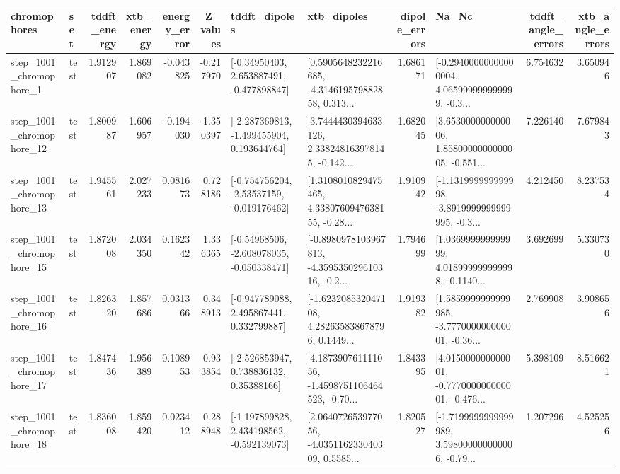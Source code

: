 \begin{tabular}{llrrrrllrlrr}
\toprule
             chromophores &       set &  tddft\_energy &  xtb\_energy &  energy\_error &  Z\_values &                               tddft\_dipoles &                                        xtb\_dipoles &  dipole\_errors &                                              Na\_Nc &  tddft\_angle\_errors &  xtb\_angle\_errors \\
\midrule
  step\_1001\_chromophore\_1 &      test &      1.912907 &    1.869082 &     -0.043825 & -0.217970 &    [-0.34950403, 2.653887491, -0.477898847] &  [0.5905648232216685, -4.314619579882858, 0.313... &       1.686171 &  [-0.29400000000000004, 4.065999999999999, -0.3... &            6.754632 &          3.650946 \\
 step\_1001\_chromophore\_12 &      test &      1.800987 &    1.606957 &     -0.194030 & -1.350397 &   [-2.287369813, -1.499455904, 0.193644764] &  [3.7444430394633126, 2.338248163978145, -0.142... &       1.682045 &  [3.653000000000006, 1.8580000000000005, -0.551... &            7.226140 &          7.679843 \\
 step\_1001\_chromophore\_13 &      test &      1.945561 &    2.027233 &      0.081673 &  0.728186 &   [-0.754756204, -2.53537159, -0.019176462] &  [1.3108010829475465, 4.3380760947638155, -0.28... &       1.910942 &  [-1.131999999999998, -3.8919999999999995, -0.3... &            4.212450 &          8.237534 \\
 step\_1001\_chromophore\_15 &      test &      1.872008 &    2.034350 &      0.162342 &  1.336365 &   [-0.54968506, -2.608078035, -0.050338471] &  [-0.8980978103967813, -4.359535029610316, -0.2... &       1.794699 &  [1.036999999999999, 4.018999999999998, -0.1140... &            3.692699 &          5.330730 \\
 step\_1001\_chromophore\_16 &      test &      1.826320 &    1.857686 &      0.031366 &  0.348913 &    [-0.947789088, 2.495867441, 0.332799887] &  [-1.623208532047108, 4.282635838678796, 0.1449... &       1.919382 &  [1.5859999999999985, -3.777000000000001, -0.36... &            2.769908 &          3.908656 \\
 step\_1001\_chromophore\_17 &      test &      1.847436 &    1.956389 &      0.108953 &  0.933854 &     [-2.526853947, 0.738836132, 0.35388166] &  [4.187390761111056, -1.4598751106464523, -0.70... &       1.843395 &  [4.015000000000001, -0.777000000000001, -0.476... &            5.398109 &          8.516621 \\
 step\_1001\_chromophore\_18 &      test &      1.836008 &    1.859420 &      0.023412 &  0.288948 &   [-1.197899828, 2.434198562, -0.592139073] &  [2.064072653977056, -4.035116233040309, 0.5585... &       1.820527 &  [-1.7199999999999989, 3.598000000000006, -0.79... &            1.207296 &          4.525256 \\

\end{tabular}
